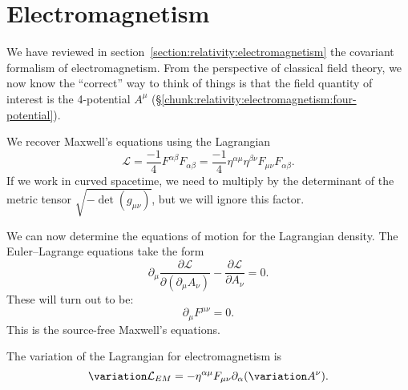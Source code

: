 \section{Electromagnetism}

\M
We have reviewed in section~\ref{section:relativity:electromagnetism}
the covariant formalism of electromagnetism. From the perspective of
classical field theory, we now know the ``correct'' way to think of
things is that the field quantity of interest is the 4-potential
$A^{\mu}$ (\S\ref{chunk:relativity:electromagnetism:four-potential}).

We recover Maxwell's equations using the Lagrangian
\begin{equation}
\mathcal{L} = \frac{-1}{4}F^{\alpha\beta}F_{\alpha\beta} = \frac{-1}{4}\eta^{\alpha\mu}\eta^{\beta\nu}F_{\mu\nu}F_{\alpha\beta}.
\end{equation}
If we work in curved spacetime, we need to multiply by the determinant
of the metric tensor $\sqrt{-\det(g_{\mu\nu})}$, but we will ignore this
factor.

We can now determine the equations of motion for the Lagrangian density.
The Euler--Lagrange equations take the form
\begin{equation}
\partial_{\mu}\frac{\partial\mathcal{L}}{\partial(\partial_{\mu}A_{\nu})}-\frac{\partial\mathcal{L}}{\partial A_{\nu}}=0.
\end{equation}
These will turn out to be:
\begin{equation}
\boxed{\partial_{\mu}F^{\mu\nu} = 0.}
\end{equation}
This is the source-free Maxwell's equations.

\begin{lemma}
  The variation of the Lagrangian for electromagnetism is
  \begin{equation}
\variation\mathcal{L}_{EM} = -\eta^{\alpha\mu}F_{\mu\nu}\partial_{\alpha}(\variation A^{\nu}).
  \end{equation}
\end{lemma}


